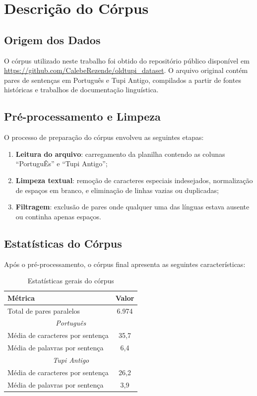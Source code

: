 \documentclass[12pt,a4paper]{article}
\begin{document}
\section{Descrição do Córpus}

\subsection{Origem dos Dados}

O córpus utilizado neste trabalho foi obtido do repositório público disponível em \url{https://github.com/CalebeRezende/oldtupi_dataset}. O arquivo original contém pares de sentenças em Português e Tupi Antigo, compilados a partir de fontes históricas e trabalhos de documentação linguística.

\subsection{Pré-processamento e Limpeza}

O processo de preparação do córpus envolveu as seguintes etapas:

\begin{enumerate}
    \item \textbf{Leitura do arquivo}: carregamento da planilha contendo as colunas ``PortuguÊs'' e ``Tupi Antigo'';
    \item \textbf{Limpeza textual}: remoção de caracteres especiais indesejados, normalização de espaços em branco, e eliminação de linhas vazias ou duplicadas;
    \item \textbf{Filtragem}: exclusão de pares onde qualquer uma das línguas estava ausente ou continha apenas espaços.
\end{enumerate}

\subsection{Estatísticas do Córpus}

Após o pré-processamento, o córpus final apresenta as seguintes características:

\begin{table}[H]
\centering
\caption{Estatísticas gerais do córpus}
\begin{tabular}{lc}
\toprule
\textbf{Métrica} & \textbf{Valor} \\
\midrule
Total de pares paralelos & 6.974 \\
\midrule
\multicolumn{2}{c}{\textit{Português}} \\
Média de caracteres por sentença & 35,7 \\
Média de palavras por sentença & 6,4 \\
\midrule
\multicolumn{2}{c}{\textit{Tupi Antigo}} \\
Média de caracteres por sentença & 26,2 \\
Média de palavras por sentença & 3,9 \\
\bottomrule
\end{tabular}
\label{tab:corpus_stats}
\end{table}
\end{document}
